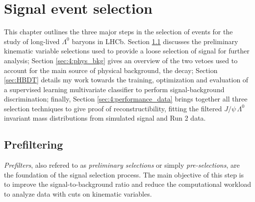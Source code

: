 \chapter{Signal event selection}
\label{cap:event_selection}
This chapter outlines the three major steps in the selection of \demonstratorshort events for the study of long-lived $\Lambda^0$ baryons in LHCb.
Section \ref{sec:prefilter} discusses the preliminary kinematic variable selections used to provide a loose selection of signal for further analysis;
Section \ref{sec:4:phys_bkg} gives an overview of the two vetoes used to account for the main source of physical background, the \physbkgshort decay;
Section \ref{sec:HBDT} details my work towards the training, optimization and evaluation of a supervised learning multivariate classifier to perform signal-background discrimination;
finally, Section \ref{sec:4:performance_data} brings together all three selection techniques to give proof of \demonstratorshort reconstructibility, fitting the filtered $J/\psi\,\Lambda^0$ invariant mass distributions from simulated signal and Run 2 data.

\section{Prefiltering}
\label{sec:prefilter}
\textit{Prefilters}, also refered to as \textit{preliminary selections} or simply \textit{pre-selections}, are the foundation of the signal selection process.
The main objective of this step is to improve the signal-to-background ratio and reduce the computational workload to analyze data with cuts on kinematic variables.

